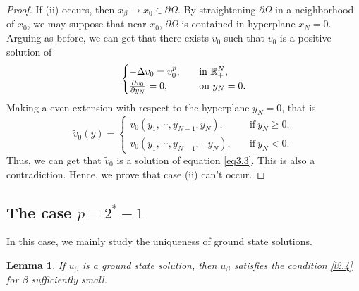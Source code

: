\documentclass[12pt,reqno]{amsart}
\numberwithin{equation}{section}
\newtheorem{lemma}[theorem]{Lemma}
\theoremstyle{definition}
\def\R{{\Bbb R}}
\begin{document}
\begin{proof}
If (ii) occurs, then $x_\beta\to x_0\in\partial\Omega$. By straightening $\partial\Omega$ in a neighborhood of $x_0$, we may suppose that near $x_0$, $\partial\Omega$ is contained in hyperplane $x_N=0$. Arguing as before, we can get that there exists $v_0$ such that $v_0$ is a positive solution of 
\begin{equation}\label{e3.8}
\begin{cases}
-\Delta v_0=v_0^p,\quad &\text{in}\ \R^N_+,\\
\frac{\partial v_0}{\partial y_N}=0, &\text{on}\ y_N=0.
\end{cases}
\end{equation}
Making a even extension with respect to the hyperplane $y_N=0$, that is 
\begin{equation*}
\tilde{v}_0(y)=
\begin{cases}
v_0(y_1,\cdots,y_{N-1},y_N),\quad &\text{if}\ y_N\ge0,\\
v_0(y_1,\cdots,y_{N-1},-y_N),\quad &\text{if}\ y_N<0.
\end{cases}
\end{equation*}
Thus, we can get that  $\tilde{v}_0$ is a solution of equation \eqref{eq3.3}. 
This is also a contradiction. Hence, we prove that case (ii) can't occur.
\end{proof}


\subsection{The case $p=2^*-1$} 
In this case, we mainly study the uniqueness of ground state solutions.

\begin{lemma}\label{lemma2.8}
If $u_\beta$ is a ground state solution, then $u_\beta$ satisfies the condition \eqref{l2.4} for $\beta$ sufficiently small.
\end{lemma}
\end{document}
